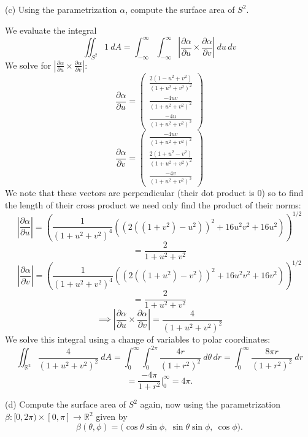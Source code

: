 \documentclass{amsart}
\begin{document}
\bigskip

(c) Using the parametrization $\alpha$, compute the surface area of $S^2$.

\medskip \noindent We evaluate the integral \[\iint_{S^2} 1 \: dA=\int_{-\infty}^{\infty}\int_{-\infty}^{\infty}\left|\frac{\partial\alpha}{\partial u}\times\frac{\partial\alpha}{\partial v}\right|\:du\,dv\]
We solve for $\left|\frac{\partial\alpha}{\partial u}\times\frac{\partial\alpha}{\partial v}\right|$:
\[\frac{\partial\alpha}{\partial u}=\begin{pmatrix}
    \frac{2(1-u^2+v^2)}{(1+u^2+v^2)^2}\\
    \frac{-4uv}{(1+u^2+v^2)^2}\\
    \frac{-4u}{(1+u^2+v^2)^2}
\end{pmatrix}\]
\[\frac{\partial\alpha}{\partial v}=\begin{pmatrix}
    \frac{-4uv}{(1+u^2+v^2)^2}\\
    \frac{2(1+u^2-v^2)}{(1+u^2+v^2)^2}\\
    \frac{-4v}{(1+u^2+v^2)^2}
\end{pmatrix}\]
We note that these vectors are perpendicular (their dot product is 0) so to find the length of their cross product
we need only find the product of their norms:
\[\left|\frac{\partial\alpha}{\partial u}\right|=\left(\frac{1}{(1+u^2+v^2)^4}((2((1+v^2)-u^2))^2+16u^2v^2+16u^2)\right)^{1/2}\]
\[=\frac{2}{1+u^2+v^2}\]
\[\left|\frac{\partial\alpha}{\partial v}\right|=\left(\frac{1}{(1+u^2+v^2)^4}((2((1+u^2)-v^2))^2+16u^2v^2+16v^2)\right)^{1/2}\]
\[=\frac{2}{1+u^2+v^2}\]
\[\implies\left|\frac{\partial\alpha}{\partial u}\times\frac{\partial\alpha}{\partial v}\right|=\frac{4}{(1+u^2+v^2)^2}\]
We solve this integral using a change of variables to polar coordinates:
\[\iint_{\mathbb{R}^2}\frac{4}{(1+u^2+v^2)^2}\:dA=\int_0^{\infty}\int_0^{2\pi}\frac{4r}{(1+r^2)^2}\:d\theta\,dr=\int_0^{\infty}\frac{8\pi r}{(1+r^2)^2}\:dr\]
\[=\frac{-4\pi}{1+r^2}\Big|_0^{\infty}=4\pi.\]

(d) Compute the surface area of $S^2$ again, now using the parametrization $\beta:[0,2\pi)\times[0,\pi]\rightarrow\mathbb{R}^2$ given by
\begin{equation*}
\beta(\theta,\phi)=\big(\cos\theta\sin\phi,\:\sin\theta\sin\phi,\:\cos\phi\big).
\end{equation*}
\end{document}
